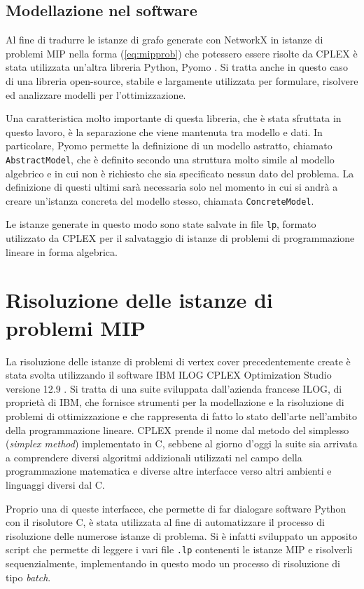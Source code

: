 \subsection{Modellazione nel software}
Al fine di tradurre le istanze di grafo generate con NetworkX in istanze di problemi MIP nella forma (\ref{eq:mipprob}) che potessero essere risolte da CPLEX è stata utilizzata un'altra libreria Python, Pyomo \cite{bynum2021pyomo}\cite{hart2011pyomo}. Si tratta anche in questo caso di una libreria open-source, stabile e largamente utilizzata per formulare, risolvere ed analizzare modelli per l'ottimizzazione.

Una caratteristica molto importante di questa libreria, che è stata sfruttata in questo lavoro, è la separazione che viene mantenuta tra modello e dati.
In particolare, Pyomo permette la definizione di un modello astratto, chiamato \texttt{AbstractModel}, che è definito secondo una struttura molto simile al modello algebrico e in cui non è richiesto che sia specificato nessun dato del problema. La definizione di questi ultimi sarà necessaria solo nel momento in cui si andrà a creare un'istanza concreta del modello stesso, chiamata \texttt{ConcreteModel}.

Le istanze generate in questo modo sono state salvate in file \texttt{lp}, formato utilizzato da CPLEX per il salvataggio di istanze di problemi di programmazione lineare in forma algebrica. 



\section{Risoluzione delle istanze di problemi MIP}
La risoluzione delle istanze di problemi di vertex cover precedentemente create è stata svolta utilizzando il software IBM ILOG CPLEX Optimization Studio versione 12.9 \cite{cplex}. Si tratta di una suite sviluppata dall'azienda francese ILOG, di proprietà di IBM, che fornisce strumenti per la modellazione e la risoluzione di problemi di ottimizzazione e che rappresenta di fatto lo stato dell'arte nell'ambito della programmazione lineare. CPLEX prende il nome dal metodo del simplesso (\textit{simplex method}) implementato in C, sebbene al giorno d'oggi la suite sia arrivata a comprendere diversi algoritmi addizionali utilizzati nel campo della programmazione matematica e diverse altre interfacce verso altri ambienti e linguaggi diversi dal C.  

Proprio una di queste interfacce,  che permette di far dialogare software Python con il risolutore C, è stata utilizzata al fine di automatizzare il processo di risoluzione delle numerose istanze di problema. Si è infatti sviluppato un apposito script che permette di leggere i vari file \texttt{.lp} contenenti le istanze MIP e risolverli sequenzialmente, implementando in questo modo un processo di risoluzione di tipo \textit{batch}. 

